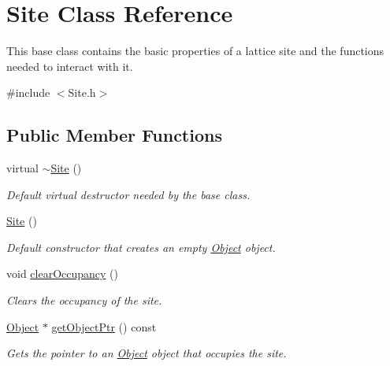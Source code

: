 \hypertarget{class_site}{}\section{Site Class Reference}
\label{class_site}


This base class contains the basic properties of a lattice site and the functions needed to interact with it.  




{\ttfamily \#include $<$Site.\+h$>$}

\subsection*{Public Member Functions}
\begin{DoxyCompactItemize}
\item 
\mbox{\label{class_site_a81f7ae39aaa7a981a6871c4816ee5562}} 
virtual \hyperlink{class_site_a81f7ae39aaa7a981a6871c4816ee5562}{$\sim$\+Site} ()
\begin{DoxyCompactList}\small\item\em Default virtual destructor needed by the base class. \end{DoxyCompactList}\item 
\mbox{\label{class_site_a4119f95c45d57d6edf419169dea993f4}} 
\hyperlink{class_site_a4119f95c45d57d6edf419169dea993f4}{Site} ()
\begin{DoxyCompactList}\small\item\em Default constructor that creates an empty \hyperlink{class_object}{Object} object. \end{DoxyCompactList}\item 
void \hyperlink{class_site_a46ff077954e39046b493ee1ea57a9c93}{clear\+Occupancy} ()
\begin{DoxyCompactList}\small\item\em Clears the occupancy of the site. \end{DoxyCompactList}\item 
\mbox{\label{class_site_aecb14e440914b4d3d4aa7294419791e2}} 
\hyperlink{class_object}{Object} $\ast$ \hyperlink{class_site_aecb14e440914b4d3d4aa7294419791e2}{get\+Object\+Ptr} () const
\begin{DoxyCompactList}\small\item\em Gets the pointer to an \hyperlink{class_object}{Object} object that occupies the site. \end{DoxyCompactList}\item 

\end{DoxyCompactItemize}
